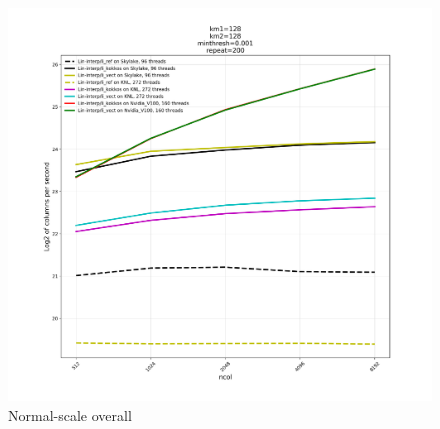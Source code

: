 \documentclass[10pt,twocolumn]{article}
\begin{document}
\begin{figure}[hbt]
  \centering
  \includegraphics[width=1.0\linewidth]{final-total.pdf}
  \caption{Normal-scale overall}
\end{figure}
\end{document}
